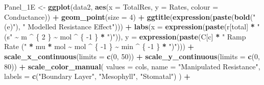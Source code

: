 \documentclass[
]{krantz}
\makeatletter
\newenvironment{Shaded}{\begin{snugshade}}{\end{snugshade}}
\newcommand{\DataTypeTok}[1]{\textcolor[rgb]{0.13,0.29,0.53}{#1}}
\newcommand{\DecValTok}[1]{\textcolor[rgb]{0.00,0.00,0.81}{#1}}
\newcommand{\KeywordTok}[1]{\textcolor[rgb]{0.13,0.29,0.53}{\textbf{#1}}}
\newcommand{\NormalTok}[1]{#1}
\newcommand{\OperatorTok}[1]{\textcolor[rgb]{0.81,0.36,0.00}{\textbf{#1}}}
\newcommand{\StringTok}[1]{\textcolor[rgb]{0.31,0.60,0.02}{#1}}
\newenvironment{kframe}{%
\medskip{}
\setlength{\fboxsep}{.8em}
 \def\at@end@of@kframe{}%
 \ifinner\ifhmode%
  \def\at@end@of@kframe{\end{minipage}}%
  \begin{minipage}{\columnwidth}%
 \fi\fi%
 \def\FrameCommand##1{\hskip\@totalleftmargin \hskip-\fboxsep
 \colorbox{shadecolor}{##1}\hskip-\fboxsep
     \hskip-\linewidth \hskip-\@totalleftmargin \hskip\columnwidth}%
 \MakeFramed {\advance\hsize-\width
   \@totalleftmargin\z@ \linewidth\hsize
   \@setminipage}}%
 {\par\unskip\endMakeFramed%
 \at@end@of@kframe}
\renewenvironment{Shaded}{\begin{kframe}}{\end{kframe}}
\makeatother
\begin{document}
\begin{Shaded}
\begin{Highlighting}[]
\NormalTok{Panel\_1E \textless{}{-}}
\StringTok{  }\KeywordTok{ggplot}\NormalTok{(data2, }\KeywordTok{aes}\NormalTok{(}\DataTypeTok{x =}\NormalTok{ TotalRes, }\DataTypeTok{y =}\NormalTok{ Rates, }\DataTypeTok{colour =}\NormalTok{ Conductance)) }\OperatorTok{+}
\StringTok{  }\KeywordTok{geom\_point}\NormalTok{(}\DataTypeTok{size =} \DecValTok{4}\NormalTok{) }\OperatorTok{+}
\StringTok{  }\KeywordTok{ggtitle}\NormalTok{(}\KeywordTok{expression}\NormalTok{(}\KeywordTok{paste}\NormalTok{(}\KeywordTok{bold}\NormalTok{(}\StringTok{"(e)"}\NormalTok{), }\StringTok{" Modelled Resistance Effect"}\NormalTok{))) }\OperatorTok{+}
\StringTok{  }\KeywordTok{labs}\NormalTok{(}\DataTypeTok{x =} \KeywordTok{expression}\NormalTok{(}\KeywordTok{paste}\NormalTok{(r[total] }\OperatorTok{*}\StringTok{ " (s"} \OperatorTok{\textasciitilde{}}\StringTok{ }\NormalTok{m }\OperatorTok{\^{}}\StringTok{ }\NormalTok{\{}
    \DecValTok{2}
\NormalTok{  \} }\OperatorTok{\textasciitilde{}}\StringTok{ }\NormalTok{mol }\OperatorTok{\^{}}\StringTok{ }\NormalTok{\{}
    \DecValTok{{-}1}
\NormalTok{  \} }\OperatorTok{*}\StringTok{ ")"}\NormalTok{)), }
  \DataTypeTok{y =} \KeywordTok{expression}\NormalTok{(}\KeywordTok{paste}\NormalTok{(C[c] }\OperatorTok{*}\StringTok{ " Ramp Rate ("} \OperatorTok{*}\StringTok{ }\NormalTok{mu }\OperatorTok{*}\StringTok{ }\NormalTok{mol }\OperatorTok{\textasciitilde{}}\StringTok{ }\NormalTok{mol }\OperatorTok{\^{}}
\StringTok{                                    }\NormalTok{\{}
                                      \DecValTok{{-}1}
\NormalTok{                                    \} }\OperatorTok{\textasciitilde{}}\StringTok{ }\NormalTok{min }\OperatorTok{\^{}}\StringTok{ }\NormalTok{\{}
                                      \DecValTok{{-}1}
\NormalTok{                                    \} }\OperatorTok{*}\StringTok{ ")"}\NormalTok{))) }\OperatorTok{+}
\StringTok{  }\KeywordTok{scale\_x\_continuous}\NormalTok{(}\DataTypeTok{limits =} \KeywordTok{c}\NormalTok{(}\DecValTok{0}\NormalTok{, }\DecValTok{50}\NormalTok{)) }\OperatorTok{+}
\StringTok{  }\KeywordTok{scale\_y\_continuous}\NormalTok{(}\DataTypeTok{limits =} \KeywordTok{c}\NormalTok{(}\DecValTok{0}\NormalTok{, }\DecValTok{80}\NormalTok{)) }\OperatorTok{+}
\StringTok{  }\KeywordTok{scale\_color\_manual}\NormalTok{(}
    \DataTypeTok{values =}\NormalTok{ cols,}
    \DataTypeTok{name =} \StringTok{"Manipulated Resistance"}\NormalTok{,}
    \DataTypeTok{labels =} \KeywordTok{c}\NormalTok{(}\StringTok{"Boundary Layer"}\NormalTok{, }\StringTok{"Mesophyll"}\NormalTok{, }\StringTok{"Stomatal"}\NormalTok{)}
\NormalTok{  ) }\OperatorTok{+}

\end{Highlighting}
\end{Shaded}
\end{document}
